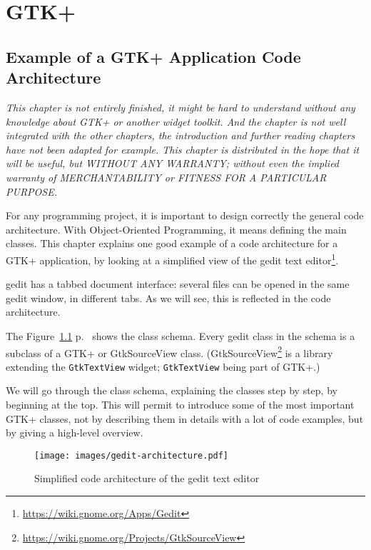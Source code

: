 \part{GTK+}
\chapter{Example of a GTK+ Application Code Architecture}
\label{gtk-app-arch}

\emph{This chapter is not entirely finished, it might be hard to understand without any knowledge about GTK+ or another widget toolkit. And the chapter is not well integrated with the other chapters, the introduction and further reading chapters have not been adapted for example. This chapter is distributed in the hope that it will be useful, but WITHOUT ANY WARRANTY; without even the implied warranty of MERCHANTABILITY or FITNESS FOR A PARTICULAR PURPOSE.}


For any programming project, it is important to design correctly the general code architecture. With Object-Oriented Programming, it means defining the main classes. This chapter explains one good example of a code architecture for a GTK+ application, by looking at a simplified view of the gedit text editor\footnote{\url{https://wiki.gnome.org/Apps/Gedit}}.

gedit has a tabbed document interface: several files can be opened in the same gedit window, in different tabs. As we will see, this is reflected in the code architecture.

The Figure~\ref{fig:gedit-architecture} p.~\pageref{fig:gedit-architecture} shows the class schema. Every gedit class in the schema is a subclass of a GTK+ or GtkSourceView class. (GtkSourceView\footnote{\url{https://wiki.gnome.org/Projects/GtkSourceView}} is a library extending the \lstinline{GtkTextView} widget; \lstinline{GtkTextView} being part of GTK+.)

We will go through the class schema, explaining the classes step by step, by beginning at the top. This will permit to introduce some of the most important GTK+ classes, not by describing them in details with a lot of code examples, but by giving a high-level overview.

\begin{figure}
  \begin{center}
    \texttt{[image: images/gedit-architecture.pdf]}
    \caption{Simplified code architecture of the gedit text editor}
    \label{fig:gedit-architecture}
  \end{center}
\end{figure}

